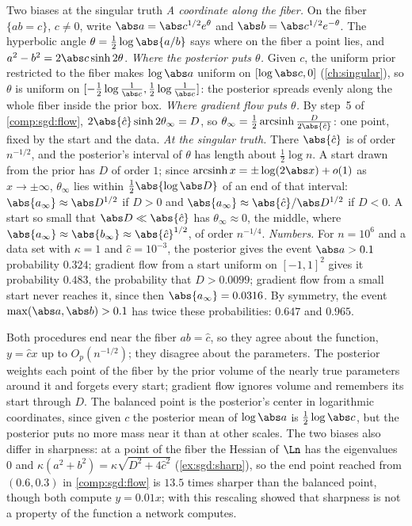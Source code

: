 \begin{refsection}
\begin{computation}{Two biases at the singular truth}\label{comp:sgd:biases}
\step \emph{A coordinate along the fiber.} On the fiber $\{ab=c\}$, $c\ne0$, write $\abs a=\abs c^{1/2}e^{\theta}$ and $\abs b=\abs c^{1/2}e^{-\theta}$. The hyperbolic angle $\theta=\frac12\log\abs{a/b}$ says where on the fiber a point lies, and $a^2-b^2=2\abs c\sinh2\theta$.
\step \emph{Where the posterior puts $\theta$.} Given $c$, the uniform prior restricted to the fiber makes $\log\abs a$ uniform on $[\log\abs c,0]$ (\cref{ch:singular}), so $\theta$ is uniform on $[-\frac12\log\frac1{\abs c},\frac12\log\frac1{\abs c}]$: the posterior spreads evenly along the whole fiber inside the prior box.
\step \emph{Where gradient flow puts $\theta$.} By step~5 of \cref{comp:sgd:flow}, $2\abs{\hat c}\sinh2\theta_\infty=D$, so $\theta_\infty=\frac12\sgdasinh\frac{D}{2\abs{\hat c}}$: one point, fixed by the start and the data.
\step \emph{At the singular truth.} There $\abs{\hat c}$ is of order $n^{-1/2}$, and the posterior's interval of $\theta$ has length about $\frac12\log n$. A start drawn from the prior has $D$ of order $1$; since $\sgdasinh x=\pm\log(2\abs x)+o(1)$ as $x\to\pm\infty$, $\theta_\infty$ lies within $\frac12\abs{\log\abs D}$ of an end of that interval: $\abs{a_\infty}\approx\abs D^{1/2}$ if $D>0$ and $\abs{a_\infty}\approx\abs{\hat c}/\abs D^{1/2}$ if $D<0$. A start so small that $\abs D\ll\abs{\hat c}$ has $\theta_\infty\approx0$, the middle, where $\abs{a_\infty}\approx\abs{b_\infty}\approx\abs{\hat c}^{1/2}$, of order $n^{-1/4}$.
\step \emph{Numbers.} For $n=10^6$ and a data set with $\kappa=1$ and $\hat c=10^{-3}$, the posterior gives the event $\abs a>0.1$ probability $0.324$; gradient flow from a start uniform on $[-1,1]^2$ gives it probability $0.483$, the probability that $D>0.0099$; gradient flow from a small start never reaches it, since then $\abs{a_\infty}=0.0316$. By symmetry, the event $\max(\abs a,\abs b)>0.1$ has twice these probabilities: $0.647$ and $0.965$.
\end{computation}

Both procedures end near the fiber $ab=\hat c$, so they agree about the function, $y=\hat cx$ up to $O_p(n^{-1/2})$; they disagree about the parameters. The posterior weights each point of the fiber by the prior volume of the nearly true parameters around it and forgets every start; gradient flow ignores volume and remembers its start through $D$. The balanced point is the posterior's center in logarithmic coordinates, since given $c$ the posterior mean of $\log\abs a$ is $\frac12\log\abs c$, but the posterior puts no more mass near it than at other scales. The two biases also differ in sharpness: at a point of the fiber the Hessian of $\Ln$ has the eigenvalues $0$ and $\kappa(a^2+b^2)=\kappa\sqrt{D^2+4\hat c^2}$ (\cref{ex:sgd:sharp}), so the end point reached from $(0.6,0.3)$ in \cref{comp:sgd:flow} is $13.5$ times sharper than the balanced point, though both compute $y=0.01x$; with this rescaling \textcite{DinhEtAl2017} showed that sharpness is not a property of the function a network computes.


\end{refsection}
